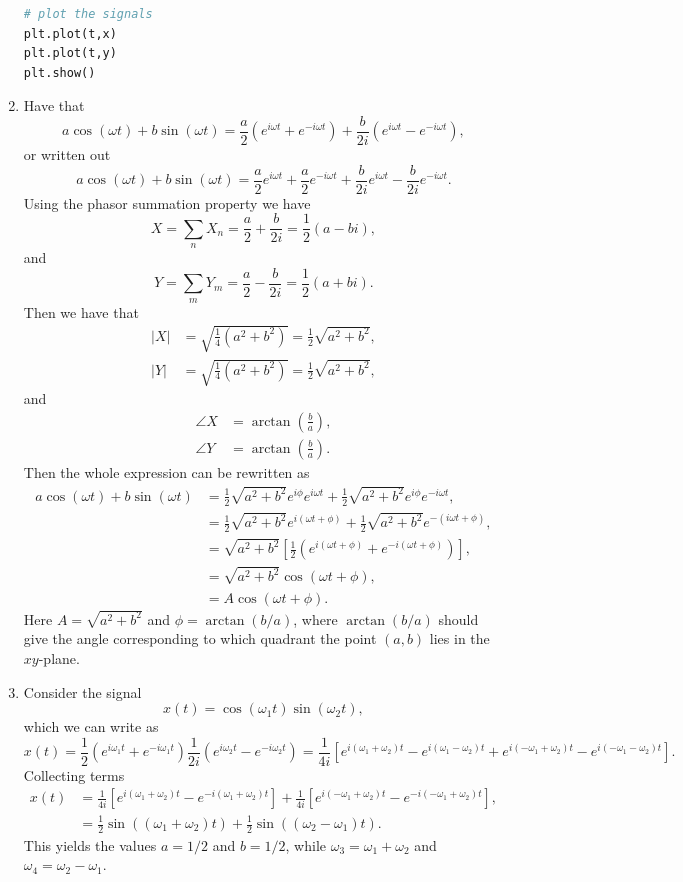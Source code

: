 \begin{enumerate}
\begin{lstlisting}[language=Python, caption=Noise canceling signal,label=cancel]
# plot the signals
plt.plot(t,x)
plt.plot(t,y)
plt.show()
\end{lstlisting}
\item Have that
$$a\cos(\omega t)+b\sin(\omega t)=\frac{a}{2}(e^{i\omega t}+e^{-i\omega t})+\frac{b}{2i}(e^{i\omega t}-e^{-i\omega t}),$$
or written out 
$$a\cos(\omega t)+b\sin(\omega t)=\frac{a}{2}e^{i\omega t}+\frac{a}{2}e^{-i\omega t}+\frac{b}{2i}e^{i\omega t}-\frac{b}{2i}e^{-i\omega t}.$$
Using the phasor summation property we have
$$X=\sum_{n}X_{n}=\frac{a}{2}+\frac{b}{2i}=\frac{1}{2}(a-bi),$$
and
$$Y=\sum_{m}Y_{m}=\frac{a}{2}-\frac{b}{2i}=\frac{1}{2}(a+bi).$$
Then we have that
\begin{align*}
    |X|&=\sqrt{\frac{1}{4}(a^{2}+b^{2})}=\frac{1}{2}\sqrt{a^{2}+b^{2}}, \\
    |Y|&=\sqrt{\frac{1}{4}(a^{2}+b^{2})}=\frac{1}{2}\sqrt{a^{2}+b^{2}},
\end{align*}
and
\begin{align*}
    \angle X&=\arctan\left(\frac{b}{a}\right), \\
    \angle Y&=\arctan\left(\frac{b}{a}\right).
\end{align*}
Then the whole expression can be rewritten as
\begin{align*}
    a\cos(\omega t)+b\sin(\omega t)&=\frac{1}{2}\sqrt{a^{2}+b^{2}}e^{i\phi}e^{i\omega t}+\frac{1}{2}\sqrt{a^{2}+b^{2}}e^{i\phi}e^{-i\omega t}, \\
    &=\frac{1}{2}\sqrt{a^{2}+b^{2}}e^{i(\omega t+\phi)}+\frac{1}{2}\sqrt{a^{2}+b^{2}}e^{-(i\omega t+\phi)}, \\
    &=\sqrt{a^{2}+b^{2}}\left[\frac{1}{2}\left(e^{i(\omega t+\phi)}+e^{-i(\omega t+\phi)}\right)\right], \\
    &=\sqrt{a^{2}+b^{2}}\cos(\omega t+\phi), \\
    &=A\cos(\omega t+\phi).
\end{align*}
Here $A=\sqrt{a^{2}+b^{2}}$ and $\phi=\arctan(b/a)$, where $\arctan(b/a)$ should give the angle corresponding to which quadrant the point $(a,b)$ lies in the $xy$-plane. 

\item Consider the signal 
$$x(t)=\cos(\omega_{1}t)\sin(\omega_{2}t),$$
which we can write as
$$x(t)=\frac{1}{2}(e^{i\omega_{1}t}+e^{-i\omega_{1} t})\frac{1}{2i}(e^{i\omega_{2}t}-e^{-i\omega_{2}t})=\frac{1}{4i}[e^{i(\omega_{1}+\omega_{2})t}-e^{i(\omega_{1}-\omega_{2})t}+e^{i(-\omega_{1}+\omega_{2})t}-e^{i(-\omega_{1}-\omega_{2})t}].$$
Collecting terms
\begin{align*}
    x(t)&=\frac{1}{4i}[e^{i(\omega_{1}+\omega_{2})t}-e^{-i(\omega_{1}+\omega_{2})t}]+\frac{1}{4i}[e^{i(-\omega_{1}+\omega_{2})t}-e^{-i(-\omega_{1}+\omega_{2})t}], \\
    &=\frac{1}{2}\sin((\omega_{1}+\omega_{2})t)+\frac{1}{2}\sin((\omega_{2}-\omega_{1})t).
\end{align*}
This yields the values $a=1/2$ and $b=1/2$, while $\omega_{3}=\omega_{1}+\omega_{2}$ and $\omega_{4}=\omega_{2}-\omega_{1}$. 


\end{enumerate}
